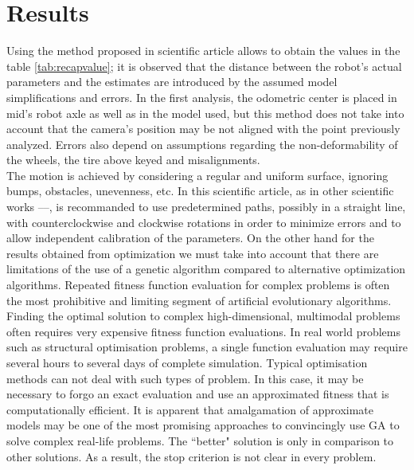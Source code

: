 \section{Results}
Using the method proposed in scientific article \cite{1512356} allows to obtain the values in the table \ref{tab:recapvalue}; it is observed that the distance between the robot’s actual parameters and the estimates are introduced by the assumed model simplifications and errors.
In the first analysis, the odometric center is placed in mid’s robot axle as well as in the model used, but this method does not take into account that the camera’s position may be not aligned with the point previously analyzed.
Errors also depend on assumptions regarding the non-deformability of the wheels, the tire above keyed and misalignments.\\ 
The motion is achieved by considering a regular and uniform surface, ignoring bumps, obstacles, unevenness, etc. 
In this scientific article, as in other scientific works \cite{censi13joint}--\cite{Jung2016}--\cite{DBLP:journals/ijrr/ChongK99}, is recommanded to use predetermined paths, possibly in a straight line, with counterclockwise and clockwise rotations in order to minimize errors and to allow independent calibration of the parameters.
On the other hand for the results obtained from optimization we must take into account that there are limitations of the use of a genetic algorithm compared to alternative optimization algorithms.
Repeated fitness function evaluation for complex problems is often the most prohibitive and limiting segment of artificial evolutionary algorithms. Finding the optimal solution to complex high-dimensional, multimodal problems often requires very expensive fitness function evaluations. In real world problems such as structural optimisation problems, a single function evaluation may require several hours to several days of complete simulation. Typical optimisation methods can not deal with such types of problem. In this case, it may be necessary to forgo an exact evaluation and use an approximated fitness that is computationally efficient. It is apparent that amalgamation of approximate models may be one of the most promising approaches to convincingly use GA to solve complex real-life problems.
The ``better" solution is only in comparison to other solutions. As a result, the stop criterion is not clear in every problem.
